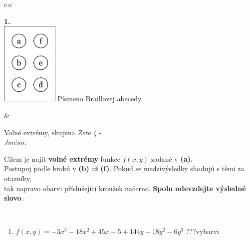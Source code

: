 \documentclass[10pt]{report}
\begin{document}
\begin{tabular}{c:c}
\begin{minipage}[c][104.5mm][t]{0.5\linewidth}
\begin{center}
\begin{minipage}{0.79\linewidth}
\begin{center}
\begin{varwidth}{\linewidth}
\begin{enumerate}
\end{enumerate}
\end{varwidth}
\end{center}
\end{minipage}
\begin{minipage}{0.20\linewidth}
\begin{center}
{\Huge\bfseries 1.} \\[2mm]
\includegraphics[height=40mm]{../images/braille.png}
{\small Písmeno Braillovej abecedy}
\end{center}
\end{minipage}
\end{center}
\end{minipage}
&
\begin{minipage}[c][104.5mm][t]{0.5\linewidth}
\begin{center}
\vspace{7mm}
{\huge Volné extrémy, skupina \textit{Zeta $\zeta$} -}\\[5mm]
\textit{Jméno:}\phantom{xxxxxxxxxxxxxxxxxxxxxxxxxxxxxxxxxxxxxxxxxxxxxxxxxxxxxxxxxxxxxxxxx}\\[5mm]
\begin{minipage}{0.95\linewidth}
\begin{center}
Cílem je najít \textbf{volné extrémy} funkce $f(x,y)$ zadané v \textbf{(a)}.\\Postupuj podle krokú v \textbf{(b)} až \textbf{(f)}. Pokud se medzivýsledky shodujú s těmi za otazníky,\\tak napravo obarvi příslušející kroužek načerno. \textbf{Spolu odevzdejte výsledné slovo}.
\end{center}
\end{minipage}
\\[1mm]
\begin{minipage}{0.79\linewidth}
\begin{center}
\begin{varwidth}{\linewidth}
\begin{enumerate}
\normalsize
\item $f(x,y)=-3x^3-18x^2+45x-5+144y-18y^2-6y^3$\quad \dotfill\; ???\;\dotfill \quad vybarvi

\end{enumerate}
\end{varwidth}
\end{center}
\end{minipage}
\end{center}
\end{minipage}
\end{tabular}
\end{document}
